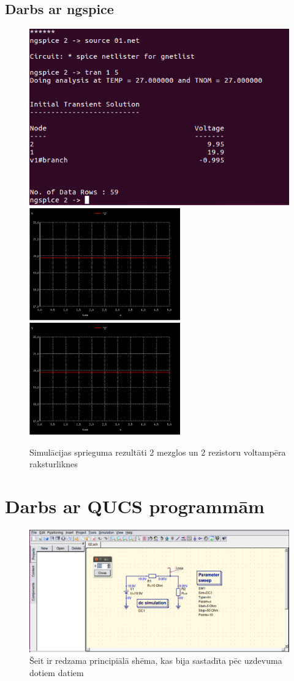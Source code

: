 \documentclass{report}
\begin{document}
\subsection{Darbs ar ngspice}
\begin{figure}[!h]
\includegraphics[width=12cm]{results.png}
\includegraphics[width=6.5cm]{01.png}
\includegraphics[width=6.5cm]{01.png}
\caption{Simulācijas sprieguma rezultāti 2 mezglos un 2 rezistoru voltampēra raksturliknes}
\end{figure}
\section{Darbs ar QUCS programmām}
\begin{figure}[!h]
\centering
\includegraphics[width=12cm]{qucs_circuit.png}
\caption{Šeit ir redzama principiālā shēma, kas bija sastadīta pēc uzdevuma dotiem datiem}
\end{figure}
\label{rer}
\end{document}
